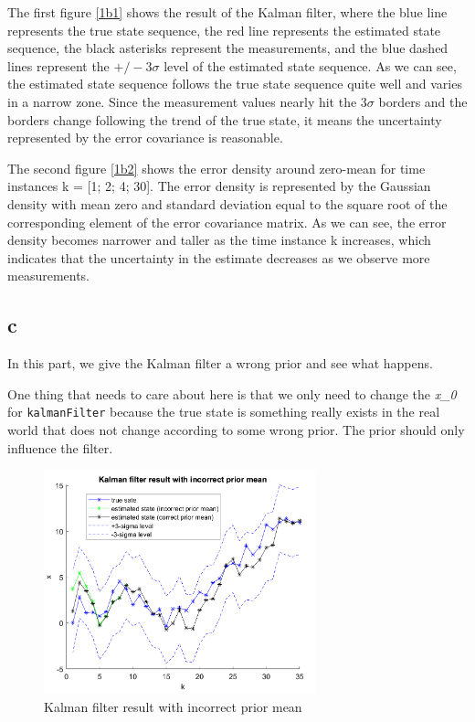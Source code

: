 The first figure \ref{1b1} shows the result of the Kalman filter, where the blue line represents the true state sequence, the red line represents the estimated state sequence, the black asterisks represent the measurements, and the blue dashed lines represent the $+/-3 \sigma$ level of the estimated state sequence. As we can see, the estimated state sequence follows the true state sequence quite well and varies in a narrow zone. Since the measurement values nearly hit the $ 3 \sigma $ borders and the borders change following the trend of the true state, it means the uncertainty represented by the error covariance is reasonable.

The second figure \ref{1b2} shows the error density around zero-mean for time instances k = [1; 2; 4; 30]. The error density is represented by the Gaussian density with mean zero and standard deviation equal to the square root of the corresponding element of the error covariance matrix. As we can see, the error density becomes narrower and taller as the time instance k increases, which indicates that the uncertainty in the estimate decreases as we observe more measurements.

\subsection{c}
In this part, we give the Kalman filter a wrong prior and see what happens.

One thing that needs to care about here is that we only need to change the \emph{x\_0} for \texttt{kalmanFilter} because the true state is something really exists in the real world that does not change according to some wrong prior. The prior should only influence the filter.

\begin{figure}[H]
 \centering
 \includegraphics[width=0.7\textwidth]{images/incorrectpriorcompare.png}
 \caption{Kalman filter result with incorrect prior mean}
 \label{1c}
\end{figure}


